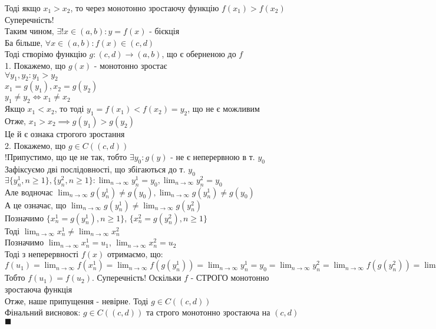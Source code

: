 \documentclass[a4paper, 14pt]{extarticle}
\def\huge{\displaystyle}
\def\bigline{\vspace{5mm}\\}
\def\bigline{\vspace{5mm}\\}
\def\qed{$\blacksquare$}
\begin{document}
Тоді якщо $x_1 > x_2$, то через монотонно зростаючу функцію $f(x_1) > f(x_2)$\\
Суперечність!\\
Таким чином, $\exists ! x \in (a,b): y = f(x)$ - бієкція\\
Ба більше, $\forall x \in (a,b): f(x) \in (c,d)$\\
Тоді створімо функцію $g: (c,d) \to (a,b)$, що є оберненою до $f$\\
1. Покажемо, що $g(x)$ - монотонно зростає\\
$\forall y_1,y_2: y_1 > y_2$\\
$x_1 = g(y_1), x_2 = g(y_2)$\\
$y_1 \neq y_2 \iff x_1 \neq x_2$\\
Якщо $x_1 < x_2$, то тоді $y_1 = f(x_1) < f(x_2) = y_2$, що не є можливим\\
Отже, $x_1 > x_2 \implies g(y_1) > g(y_2)$\\
Це й є ознака строгого зростання
\bigline
2. Покажемо, що $g \in C((c,d))$\\
!Припустимо, що це не так, тобто $\exists y_0: g(y)$ - не є неперервною в т. $y_0$\\
Зафіксуємо дві послідовності, що збігаються до т. $y_0$\\
$\exists \{y_n^1, n \geq 1\}, \{y_n^2, n \geq 1\}: \huge \lim_{n \to \infty} y_n^1 = y_0, \huge \lim_{n \to \infty} y_n^2 = y_0$\\
Але водночас $\huge \lim_{n \to \infty} g(y_n^1) \neq g(y_0), \huge \lim_{n \to \infty} g(y_n^1) \neq g(y_0)$\\
А це означає, що $\huge \lim_{n \to \infty} g(y_n^1) \neq \lim_{n \to \infty} g(y_n^2)$\\
Позначимо $\{x_n^1 = g(y_n^1), n \geq 1 \}$, $\{x_n^2 = g(y_n^2), n \geq 1 \}$\\
Тоді $\huge \lim_{n \to \infty} x_n^1 \neq \lim_{n \to \infty} x_n^2$\\
Позначимо $\huge \lim_{n \to \infty} x_n^1 = u_1$, $\huge \lim_{n \to \infty} x_n^2 = u_2$\\
Тоді з неперервності $f(x)$ отримаємо, що:\\
$f(u_1) = \huge \lim_{n \to \infty} f(x_n^1) = \lim_{n \to \infty} f(g(y_n^1)) = \lim_{n \to \infty} y_n^1 = y_0 = \lim_{n \to \infty} y_n^2 = \lim_{n \to \infty} f(g(y_n^2)) = \lim_{n \to \infty} f(x_n^2) = f(u_2)$\\
Тобто $f(u_1) = f(u_2)$. Суперечність! Оскільки $f$ - СТРОГО монотонно зростаюча функція\\
Отже, наше припущення - невірне. Тоді $g \in C((c,d))$
\bigline
Фінальний висновок: $g \in C((c,d))$ та строго монотонно зростаюча на $(c,d)$ \qed
\bigline
\end{document}
